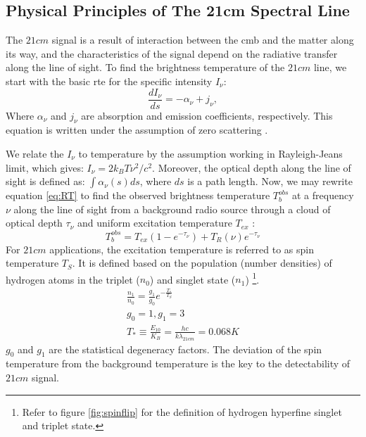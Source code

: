 \documentclass[12pt, TexShade, letterpaper]{report}
\begin{document}
\subsection{Physical Principles of The 21cm Spectral Line}
The $21cm$ signal is a result of interaction between the \gls{cmb} and the matter along its way, and the characteristics of the signal depend on the radiative transfer along the line of sight. To find the brightness temperature of the $21cm$ line, we start with the basic \gls{rte} for the specific intensity $I_{\nu}$:
\begin{equation}
    \frac{dI_\nu}{ds} = - \alpha_\nu + j_\nu ,
    \label{eq:RT}
\end{equation}
Where $\alpha_\nu$ and $j_\nu$ are absorption and emission coefficients, respectively. This equation is written under the assumption of zero scattering \cite{21century, low_frequency}. \par
We relate the $I_\nu$ to temperature by the assumption working in Rayleigh-Jeans limit, which gives: $I_\nu = 2k_B T \nu^2 /c^2$. Moreover, the optical depth along the line of sight is defined as: $\int \alpha_\nu \left(s\right) ds$, where $ds$ is a path length. Now, we may rewrite equation \ref{eq:RT} to find the observed brightness temperature $T^{obs}_b$ at a frequency $\nu$ along the line of sight from a background radio source through a cloud of optical depth $\tau_\nu$ and uniform excitation temperature $T_{ex}$ \cite{21century, low_frequency}:
\begin{equation}
    T^{obs}_b = T_{ex} \left(1-e^{-\tau_\nu} \right) + T_R \left (\nu \right) e ^{-\tau_\nu}
\end{equation}
For $21cm$ applications, the excitation temperature is referred to as spin temperature $T_S$. It is defined based on the population (number densities) of hydrogen atoms in the triplet ($n_0$) and singlet state ($n_1$) \footnote{Refer to figure \ref{fig:spinflip} for the definition of hydrogen hyperfine singlet and triplet state.}\cite{21century, low_frequency}.
\begin{gather}
    \frac{n_1}{n_0} = \frac{g_1}{g_0} e ^ {-\frac{T_*}{T_S}}\\
    g_0 =1, g_1 =3\\
     T_* \equiv \frac{E_{10}}{K_B} = \frac {hc}{k\lambda_{21cm}} = 0.068 K
\end{gather}
$g_0$ and $g_1$ are the statistical degeneracy factors. The deviation of the spin temperature from the background temperature is the key to the detectability of $21cm$ signal.\par
\end{document}
